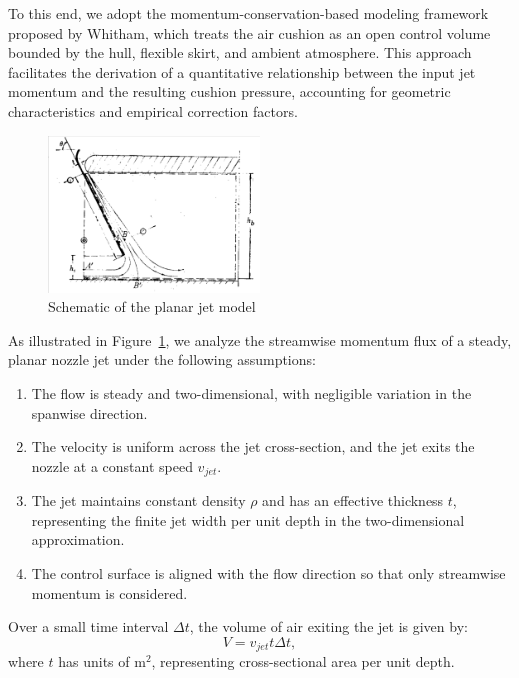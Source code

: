 To this end, we adopt the momentum-conservation-based modeling framework proposed by Whitham, which treats the air cushion as an open control volume bounded by the hull, flexible skirt, and ambient atmosphere. This approach facilitates the derivation of a quantitative relationship between the input jet momentum and the resulting cushion pressure, accounting for geometric characteristics and empirical correction factors.

\begin{figure}[H]
  \centering
  \includegraphics[width=0.5\textwidth]{images/JetModel.png}
  \caption{Schematic of the planar jet model}
  \label{fig:JetModel}
\end{figure}

As illustrated in Figure~\ref{fig:JetModel}, we analyze the streamwise momentum flux of a steady, planar nozzle jet under the following assumptions:
\begin{enumerate}
    \item The flow is steady and two-dimensional, with negligible variation in the spanwise direction.
    \item The velocity is uniform across the jet cross-section, and the jet exits the nozzle at a constant speed \( v_{jet} \).
    \item The jet maintains constant density \( \rho \) and has an effective thickness \( t \), representing the finite jet width per unit depth in the two-dimensional approximation.
    \item The control surface is aligned with the flow direction so that only streamwise momentum is considered.
\end{enumerate}

Over a small time interval \( \Delta t \), the volume of air exiting the jet is given by:
\begin{equation}
V = v_{jet} t \Delta t,
\end{equation}
where \( t \) has units of \( \mathrm{m}^2 \), representing cross-sectional area per unit depth.

